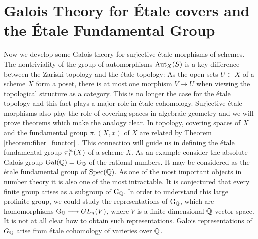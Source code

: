 %

\section{Galois Theory for \'Etale covers and the \'Etale Fundamental Group}
Now we develop some Galois theory for surjective \'etale morphisms of schemes. The nontriviality of the group of automorphisms $\operatorname{Aut}_X(S)$ is a key difference between the Zariski topology and the \'etale topology: As the open sets $U \subset X$ of a scheme $X$ form a poset, there is at most one morphism $V \to U$ when viewing the topological structure as a category. This is no longer the case for the \'etale topology and this fact plays a major role in \'etale cohomology. Surjective \'etale morphisms also play the role of covering spaces in algebraic geometry and we will prove theorems which make the analogy clear. In topology, covering spaces of $X$ and the fundamental group $\pi_1(X,x)$ of $X$ are related by Theorem \ref{theorem:fiber_functor} . This connection will guide us in defining the \'etale fundamental group $\pi^{\text{\'et}}_1(X)$ of a scheme $X$. As an example consider the absolute Galois group $\operatorname{Gal}(\mathbb{Q}) = \operatorname{G}_{\mathbb{Q}}$ of the rational numbers. It may be considered as the \'etale fundamental group of $\operatorname{Spec}(\mathbb{Q})$. As one of the most important objects in number theory it is also one of the most intractable. It is conjectured that every finite group arises as a subgroup of $\operatorname{G}_{\mathbb{Q}}$. In order to understand this large profinite group, we could study the representations of $\operatorname{G}_{\mathbb{Q}}$, which are homomorphisms $\operatorname{G}_{\mathbb{Q}} \longrightarrow GL_n(V)$, where $V$ is a finite dimensional $\mathbb{Q}$-vector space. It is not at all clear how to obtain such representations. Galois representations of $G_{\mathbb{Q}}$ arise from \'etale cohomology of varieties over $\mathbb{Q}$.

